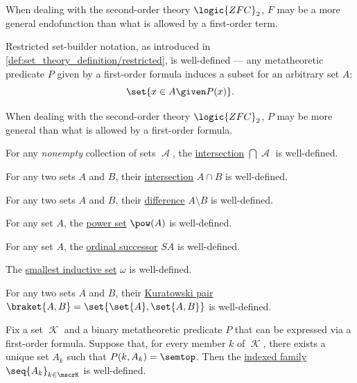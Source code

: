 \begin{proposition}
\begin{thmenum}
    When dealing with the second-order theory \( \logic{ZFC}_2 \), \( F \) may be a more general endofunction than what is allowed by a first-order term.

     Restricted set-builder notation, as introduced in \cref{def:set_theory_definition/restricted}, is well-defined --- any metatheoretic predicate \( P \) given by a first-order formula induces a subset for an arbitrary set \( A \):
    \begin{equation*}
      \set{ x \in A \given P(x) }.
    \end{equation*}

    When dealing with the second-order theory \( \logic{ZFC}_2 \), \( P \) may be more general than what is allowed by a first-order formula.

     For any \emph{nonempty} collection of sets \( \mscrA \), the \hyperref[def:set_intersection/unary]{intersection} \( \bigcap \mscrA \) is well-defined.

     For any two sets \( A \) and \( B \), their \hyperref[def:set_intersection]{intersection} \( A \cap B \) is well-defined.

     For any two sets \( A \) and \( B \), their \hyperref[def:set_difference]{difference} \( A \setminus B \) is well-defined.

     For any set \( A \), the \hyperref[def:power_set]{power set} \( \pow(A) \) is well-defined.

     For any set \( A \), the \hyperref[def:ordinal_successor]{ordinal successor} \( S A \) is well-defined.

     The \hyperref[def:smallest_inductive_set]{smallest inductive set} \( \omega \) is well-defined.

     For any two sets \( A \) and \( B \), their \hyperref[def:kuratowski_pair]{Kuratowski pair} \( \braket{ A, B } = \set{ \set{ A }, \set{ A, B } } \) is well-defined.

     Fix a set \( \mscrK \) and a binary metatheoretic predicate \( P \) that can be expressed via a first-order formula. Suppose that, for every member \( k \) of \( \mscrK \), there exists a unique set \( A_k \) such that \( P(k, A_k) = \semtop \). Then the \hyperref[def:indexed_family]{indexed family} \( \seq{ A_k }_{k \in \mscrK} \) is well-defined.


\end{thmenum}
\end{proposition}
